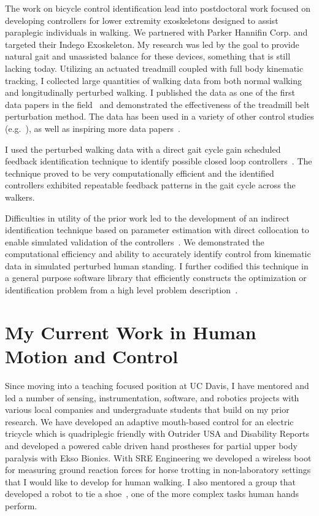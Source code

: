 \documentclass{article}
\begin{document}
The work on bicycle control identification lead into postdoctoral work focused
on developing controllers for lower extremity exoskeletons designed to assist
paraplegic individuals in walking. We partnered with Parker Hannifin Corp. and
targeted their Indego Exoskeleton. My research was led by the goal to provide
natural gait and unassisted balance for these devices, something that is still
lacking today. Utilizing an actuated treadmill coupled with full body kinematic
tracking, I collected large quantities of walking data from both normal walking
and longitudinally perturbed walking. I published the data as one of the first
data papers in the field~\cite{Moore2015b} and demonstrated the effectiveness
of the treadmill belt perturbation method. The data has been used in a variety
of other control studies (e.g.~\cite{Rohani2017,Thatte2018,Vimal2019}), as well
as inspiring more data
papers~\cite{Santos2016,Fukuchi2017,Fukuchi2018,Santuz2018}.

I used the perturbed walking data with a direct gait cycle gain scheduled
feedback identification technique to identify possible closed loop
controllers~\cite{Moore2013c,Moore2014a,Moore2014c}. The technique proved to be
very computationally efficient and the identified controllers exhibited
repeatable feedback patterns in the gait cycle across the walkers.

Difficulties in utility of the prior work led to the development of an indirect
identification technique based on parameter estimation with direct collocation
to enable simulated validation of the controllers~\cite{Moore2014e,Moore2015}.
We demonstrated the computational efficiency and ability to accurately identify
control from kinematic data in simulated perturbed human standing. I further
codified this technique in a general purpose software library that efficiently
constructs the optimization or identification problem from a high level problem
description~\cite{Moore2014,Moore2018}.

\section*{My Current Work in Human Motion and Control}
%
Since moving into a teaching focused position at UC Davis, I have mentored and
led a number of sensing, instrumentation, software, and robotics projects with
various local companies and undergraduate students that build on my prior
research. We have developed an adaptive mouth-based control for an electric
tricycle which is quadriplegic friendly with Outrider USA and Disability
Reports and developed a powered cable driven hand prostheses for partial upper
body paralysis with Ekso Bionics. With SRE Engineering we developed a wireless
boot for measuring ground reaction forces for horse trotting in non-laboratory
settings that I would like to develop for human walking. I also mentored a
group that developed a robot to tie a shoe~\cite{Choi2018}, one of the more
complex tasks human hands perform.
\end{document}
